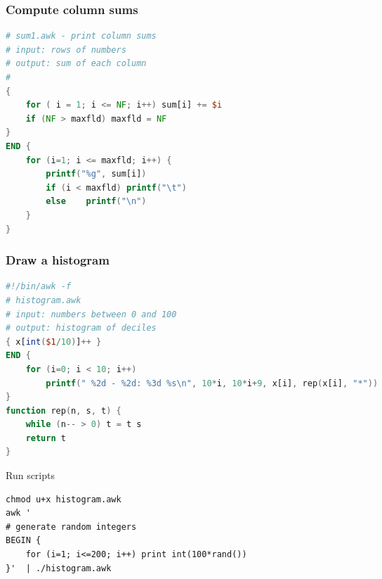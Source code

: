 \documentclass[red]{beamer}
\begin{document}
\begin{CJK*}{UTF8}{gbsn}
\begin{frame}
\frametitle{Compute column sums}
\begin{lstlisting}[language=awk,format=awk]
# sum1.awk - print column sums
# input: rows of numbers
# output: sum of each column
#
{
	for ( i = 1; i <= NF; i++) sum[i] += $i
	if (NF > maxfld) maxfld = NF
}
END {
	for (i=1; i <= maxfld; i++) {
		printf("%g", sum[i])
		if (i < maxfld) printf("\t")
		else 	printf("\n")
	}
}
\end{lstlisting}
\end{frame}


\begin{frame}
\frametitle{Draw a histogram}
\begin{lstlisting}[language=awk,format=awk]
#!/bin/awk -f
# histogram.awk
# input: numbers between 0 and 100
# output: histogram of deciles
{ x[int($1/10)]++ }
END {
	for (i=0; i < 10; i++)
		printf(" %2d - %2d: %3d %s\n", 10*i, 10*i+9, x[i], rep(x[i], "*"))
}
function rep(n, s, t) {
	while (n-- > 0) t = t s
	return t
}
\end{lstlisting}
\begin{block}{Run scripts}
\begin{lstlisting}
chmod u+x histogram.awk
awk '
# generate random integers
BEGIN {
	for (i=1; i<=200; i++) print int(100*rand())
}'  | ./histogram.awk
\end{lstlisting}
\end{block}
\end{frame}



\end{CJK*}
\end{document}
